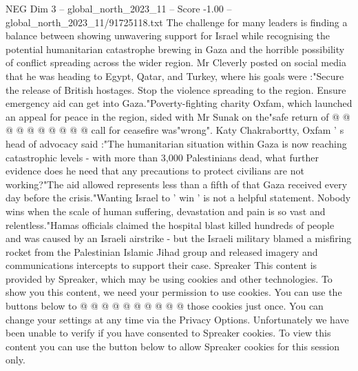 \begin{textsample}{NEG Dim 3 – global\_north\_2023\_11 – Score -1.00 – global\_north\_2023\_11/91725118.txt}
The challenge for many leaders is finding a balance between showing unwavering support for Israel while recognising the potential humanitarian catastrophe brewing in Gaza and the horrible possibility of conflict spreading across the wider region.
Mr Cleverly posted on social media that he was heading to Egypt, Qatar, and Turkey, where his goals were :"Secure the release of British hostages.
Stop the violence spreading to the region.
Ensure emergency aid can get into Gaza."Poverty-fighting charity Oxfam, which launched an appeal for peace in the region, sided with Mr Sunak on the"safe return of @ @ @ @ @ @ @ @ @ @ call for ceasefire was"wrong".
Katy Chakrabortty, Oxfam ' s head of advocacy said :"The humanitarian situation within Gaza is now reaching catastrophic levels - with more than 3,000 Palestinians dead, what further evidence does he need that any precautions to protect civilians are not working?"The aid allowed represents less than a fifth of that Gaza received every day before the crisis."Wanting Israel to ' win ' is not a helpful statement.
Nobody wins when the scale of human suffering, devastation and pain is so vast and relentless."Hamas officials claimed the hospital blast killed hundreds of people and was caused by an Israeli airstrike - but the Israeli military blamed a misfiring rocket from the Palestinian Islamic Jihad group and released imagery and communications intercepts to support their case.
Spreaker This content is provided by Spreaker, which may be using cookies and other technologies.
To show you this content, we need your permission to use cookies.
You can use the buttons below to @ @ @ @ @ @ @ @ @ @ those cookies just once.
You can change your settings at any time via the Privacy Options.
Unfortunately we have been unable to verify if you have consented to Spreaker cookies.
To view this content you can use the button below to allow Spreaker cookies for this session only.

\end{textsample}
